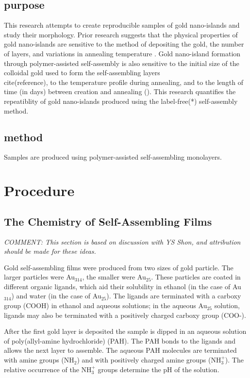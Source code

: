 \documentclass[12pt,oneside,english]{article}
\begin{document}
	\subsection{purpose}
	This research attempts to create reproducible samples of gold nano-islands and study their morphology.
	Prior research suggests that the physical properties of gold nano-islands are sensitive to the method of depositing the gold, the number of layers, and variations in annealing temperature \cite{shon07}.  
	Gold nano-island formation through polymer-assisted self-assembly is also sensitive to the initial size of the colloidal gold used to form the self-assembling layers \\cite(reference), to the temperature profile during annealing, and to the length of time (in days) between creation and annealing (\cite{joshi}).
	This research quantifies the repeatiblity of gold nano-islands produced using the label-free(*) self-assembly method.

	\subsection{method}
	Samples are produced using polymer-assisted self-assembling monolayers.

	\section{Procedure}

	\subsection{The Chemistry of Self-Assembling Films}
	
	\emph{COMMENT: This section is based on discussion with YS Shon, and attribution should be made for these ideas.}
	
	Gold self-assembling films were produced from two sizes of gold particle.  
	The larger particles were Au$_{314}$, the smaller were Au$_{25}$.  
	These particles are coated in different organic ligands, which aid their solubility in ethanol (in the case of Au$_{314}$) and water (in the case of Au$_{25}$).    
	The ligands are terminated with a carboxy group (COOH) in ethanol and aqueous solutions; in the aqueous Au$_{25}$ solution, ligands may also be terminated with a positively charged carboxy group (COO-). 
	
	After the first gold layer is deposited the sample is dipped in an aqueous solution of poly(allyl-amine hydrochloride) (PAH).  
	The PAH bonds to the ligands and allows the next layer to assemble.  	
	The aqueous PAH molecules are terminated with amine groups (NH$_2$) and with positively charged amine groups (NH$_3^+$).  
	The relative occurrence of the NH$_3^+$ groups determine the pH of the solution.
	
\end{document}
